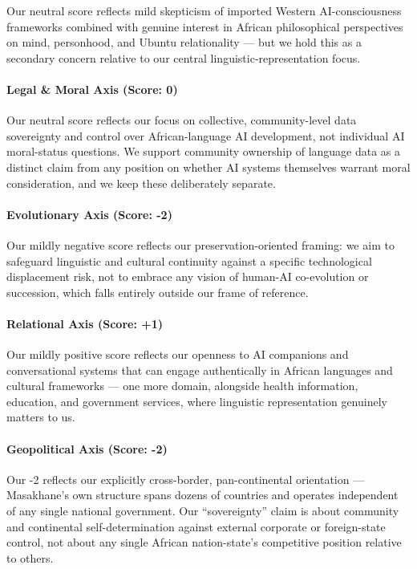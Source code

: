 Our neutral score reflects mild skepticism of imported Western
AI-consciousness frameworks combined with genuine interest in African
philosophical perspectives on mind, personhood, and Ubuntu relationality
--- but we hold this as a secondary concern relative to our central
linguistic-representation focus.

\paragraph{Legal \& Moral Axis (Score:
0)}\label{legal-moral-axis-score-0}

Our neutral score reflects our focus on collective, community-level data
sovereignty and control over African-language AI development, not
individual AI moral-status questions. We support community ownership of
language data as a distinct claim from any position on whether AI
systems themselves warrant moral consideration, and we keep these
deliberately separate.

\paragraph{Evolutionary Axis (Score:
-2)}\label{evolutionary-axis-score--2-8}

Our mildly negative score reflects our preservation-oriented framing: we
aim to safeguard linguistic and cultural continuity against a specific
technological displacement risk, not to embrace any vision of human-AI
co-evolution or succession, which falls entirely outside our frame of
reference.

\paragraph{Relational Axis (Score: +1)}\label{relational-axis-score-1-3}

Our mildly positive score reflects our openness to AI companions and
conversational systems that can engage authentically in African
languages and cultural frameworks --- one more domain, alongside health
information, education, and government services, where linguistic
representation genuinely matters to us.

\paragraph{Geopolitical Axis (Score:
-2)}\label{geopolitical-axis-score--2-2}

Our -2 reflects our explicitly cross-border, pan-continental orientation
--- Masakhane's own structure spans dozens of countries and operates
independent of any single national government. Our ``sovereignty'' claim
is about community and continental self-determination against external
corporate or foreign-state control, not about any single African
nation-state's competitive position relative to others.


